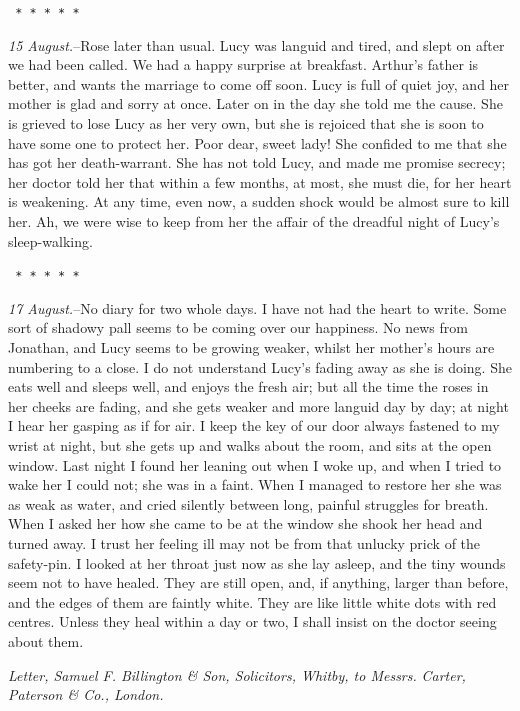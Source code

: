 \documentclass[12pt,openright]{book}
\begin{document}
\texttt{   *       *       *       *       *}

\textit{15 August.}–Rose later than usual. Lucy was languid and tired, and slept on after we had been called. We had a happy surprise at breakfast. Arthur’s father is better, and wants the marriage to come off soon. Lucy is full of quiet joy, and her mother is glad and sorry at once. Later on in the day she told me the cause. She is grieved to lose Lucy as her very own, but she is rejoiced that she is soon to have some one to protect her. Poor dear, sweet lady! She confided to me that she has got her death-warrant. She has not told Lucy, and made me promise secrecy; her doctor told her that within a few months, at most, she must die, for her heart is weakening. At any time, even now, a sudden shock would be almost sure to kill her. Ah, we were wise to keep from her the affair of the dreadful night of Lucy’s sleep-walking.

\texttt{   *       *       *       *       *}

\textit{17 August.}–No diary for two whole days. I have not had the heart to write. Some sort of shadowy pall seems to be coming over our happiness. No news from Jonathan, and Lucy seems to be growing weaker, whilst her mother’s hours are numbering to a close. I do not understand Lucy’s fading away as she is doing. She eats well and sleeps well, and enjoys the fresh air; but all the time the roses in her cheeks are fading, and she gets weaker and more languid day by day; at night I hear her gasping as if for air. I keep the key of our door always fastened to my wrist at night, but she gets up and walks about the room, and sits at the open window. Last night I found her leaning out when I woke up, and when I tried to wake her I could not; she was in a faint. When I managed to restore her she was as weak as water, and cried silently between long, painful struggles for breath. When I asked her how she came to be at the window she shook her head and turned away. I trust her feeling ill may not be from that unlucky prick of the safety-pin. I looked at her throat just now as she lay asleep, and the tiny wounds seem not to have healed. They are still open, and, if anything, larger than before, and the edges of them are faintly white. They are like little white dots with red centres. Unless they heal within a day or two, I shall insist on the doctor seeing about them.

\textit{Letter, Samuel F. Billington \& Son, Solicitors, Whitby, to Messrs.}\textit{ }\textit{Carter, Paterson \& Co., London.}
\end{document}
